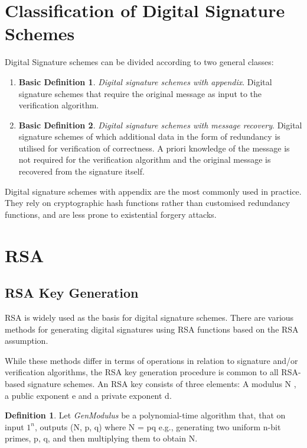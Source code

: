 \documentclass[]{final_report}
\theoremstyle{definition}
\newtheorem{definition}{Definition}[chapter]
\newtheorem{basic}{Basic Definition}
\begin{document}
\section{Classification of Digital Signature Schemes}
Digital Signature schemes can be divided according to two general classes:
\begin{enumerate}
    \item \begin{basic} 
\textit{Digital signature schemes with appendix}. Digital signature schemes that require the original message as input to the verification algorithm.
\end{basic}
    \item \begin{basic}
\textit{Digital signature schemes with message recovery}. Digital signature schemes of which additional data in the form of redundancy is utilised for verification of correctness. A priori knowledge of the message is not required for the verification algorithm and the original message is recovered from the signature itself.
\end{basic}

\end{enumerate}

Digital signature schemes with appendix are the most commonly used in practice. They rely on cryptographic hash functions rather than customised redundancy functions, and are less prone to existential forgery attacks.


\section{RSA}
\subsection{RSA Key Generation}
RSA is widely used as the basis for digital signature schemes. There are various methods for generating digital signatures using RSA functions based on the RSA assumption. 


While these methods differ in terms of operations in relation to signature and/or verification algorithms, the RSA key generation procedure is common to all RSA-based signature schemes.  An RSA key consists of three elements: A modulus N , a public exponent e and a private exponent d.

\begin{definition}
Let \textit{GenModulus} be a polynomial-time algorithm that, that on input $1^n$, outputs (N, p, q) where N = pq e.g.,  generating two uniform n-bit primes,  p, q, and then multiplying them to obtain N.
\end{definition}
\end{document}
